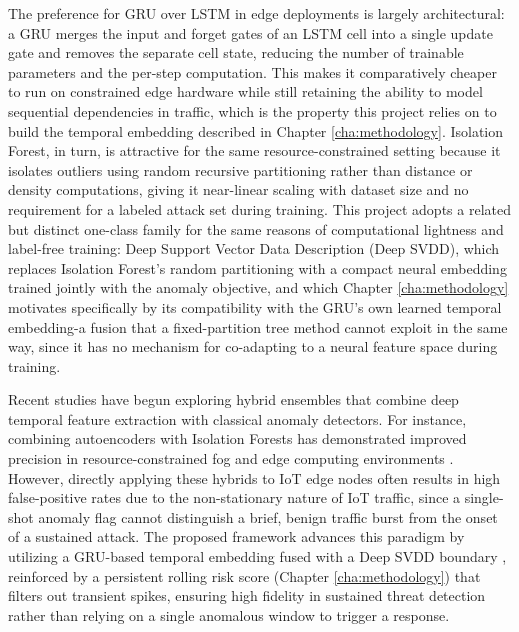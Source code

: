 The preference for GRU over LSTM in edge deployments is largely architectural: a GRU merges the input and forget gates of an LSTM cell into a single update gate and removes the separate cell state, reducing the number of trainable parameters and the per-step computation. This makes it comparatively cheaper to run on constrained edge hardware while still retaining the ability to model sequential dependencies in traffic, which is the property this project relies on to build the temporal embedding described in Chapter \ref{cha:methodology}. Isolation Forest, in turn, is attractive for the same resource-constrained setting because it isolates outliers using random recursive partitioning rather than distance or density computations, giving it near-linear scaling with dataset size and no requirement for a labeled attack set during training. This project adopts a related but distinct one-class family for the same reasons of computational lightness and label-free training: Deep Support Vector Data Description (Deep SVDD), which replaces Isolation Forest's random partitioning with a compact neural embedding trained jointly with the anomaly objective, and which Chapter \ref{cha:methodology} motivates specifically by its compatibility with the GRU's own learned temporal embedding-a fusion that a fixed-partition tree method cannot exploit in the same way, since it has no mechanism for co-adapting to a neural feature space during training.

Recent studies have begun exploring hybrid ensembles that combine deep temporal feature extraction with classical anomaly detectors. For instance, combining autoencoders with Isolation Forests has demonstrated improved precision in resource-constrained fog and edge computing environments \cite{Sadaf2020}. However, directly applying these hybrids to IoT edge nodes often results in high false-positive rates due to the non-stationary nature of IoT traffic, since a single-shot anomaly flag cannot distinguish a brief, benign traffic burst from the onset of a sustained attack. The proposed framework advances this paradigm by utilizing a GRU-based temporal embedding fused with a Deep SVDD boundary \cite{Ruff2018}, reinforced by a persistent rolling risk score (Chapter \ref{cha:methodology}) that filters out transient spikes, ensuring high fidelity in sustained threat detection rather than relying on a single anomalous window to trigger a response.

